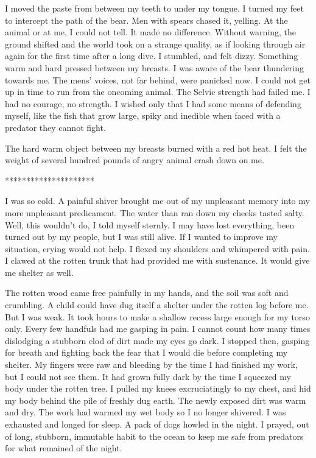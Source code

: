I moved the paste from between my teeth to under my tongue. I turned my feet to intercept the path of the bear. Men with spears chased it, yelling. At the animal or at me, I could not tell. It made no difference. Without warning, the ground shifted and the world took on a strange quality, as if looking through air again for the first time after a long dive. I stumbled, and felt dizzy. Something warm and hard pressed between my breasts. I was aware of the bear thundering towards me. The mens' voices, not far behind, were panicked now. I could not get up in time to run from the oncoming animal. The Selvic strength had failed me. I had no courage, no strength. I wished only that I had some means of defending myself, like the fish that grow large, spiky and inedible when faced with a predator they cannot fight.

The hard warm object between my breasts burned with a red hot heat. I felt the weight of several hundred pounds of angry animal crash down on me.

*********************

I was so cold. A painful shiver brought me out of my unpleasant memory into my more unpleasant predicament. The water than ran down my cheeks tasted salty. Well, this wouldn't do, I told myself sternly. I may have lost everything, been turned out by my people, but I was still alive. If I wanted to improve my situation, crying would not help. I flexed my shoulders and whimpered with pain. I clawed at the rotten trunk that had provided me with sustenance. It would give me shelter as well.

The rotten wood came free painfully in my hands, and the soil was soft and crumbling. A child could have dug itself a shelter under the rotten log before me. But I was weak. It took hours to make a shallow recess large enough for my torso only. Every few handfuls had me gasping in pain. I cannot count how many times dislodging a stubborn clod of dirt made my eyes go dark. I stopped then, gasping for breath and fighting back the fear that I would die before completing my shelter. My fingers were raw and bleeding by the time I had finished my work, but I could not see them. It had grown fully dark by the time I squeezed my body under the rotten tree. I pulled my knees excruciatingly to my chest, and hid my body behind the pile of freshly dug earth. The newly exposed dirt was warm and dry. The work had warmed my wet body so I no longer shivered. I was exhausted and longed for sleep. A pack of dogs howled in the night. I prayed, out of long, stubborn, immutable habit to the ocean to keep me safe from predators for what remained of the night.

